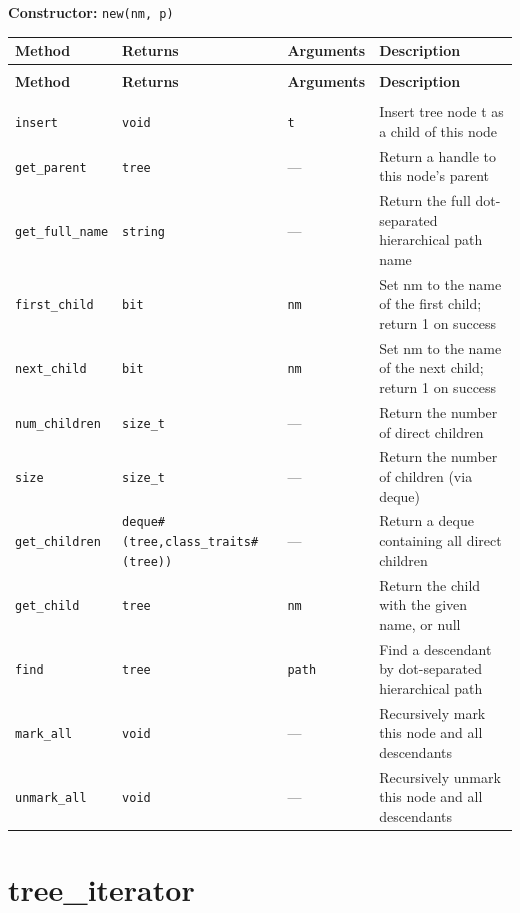 \documentclass[11pt,letterpaper]{report}
\begin{document}
\noindent\textbf{Constructor:} \texttt{new(nm, p)}

\begin{xltabular}{\linewidth}{>{\small}p{1.35in} >{\small}p{1.25in} >{\small}p{0.95in} >{\small}X}
\toprule
\textbf{Method} & \textbf{Returns} & \textbf{Arguments} & \textbf{Description} \\
\midrule
\endfirsthead
{} \\
\midrule
\textbf{Method} & \textbf{Returns} & \textbf{Arguments} & \textbf{Description} \\
\midrule
\endhead
\midrule
{} \\
\endfoot
\bottomrule
\endlastfoot
\texttt{insert} & \texttt{void} & \texttt{t} & Insert tree node t as a child of this node \\
\texttt{get\_parent} & \texttt{tree} & --- & Return a handle to this node's parent \\
\texttt{get\_full\_name} & \texttt{string} & --- & Return the full dot-separated hierarchical path name \\
\texttt{first\_child} & \texttt{bit} & \texttt{nm} & Set nm to the name of the first child; return 1 on success \\
\texttt{next\_child} & \texttt{bit} & \texttt{nm} & Set nm to the name of the next child; return 1 on success \\
\texttt{num\_children} & \texttt{size\_t} & --- & Return the number of direct children \\
\texttt{size} & \texttt{size\_t} & --- & Return the number of children (via deque) \\
\texttt{get\_children} & \texttt{deque\#(tree,class\_traits\#(tree))} & --- & Return a deque containing all direct children \\
\texttt{get\_child} & \texttt{tree} & \texttt{nm} & Return the child with the given name, or null \\
\texttt{find} & \texttt{tree} & \texttt{path} & Find a descendant by dot-separated hierarchical path \\
\texttt{mark\_all} & \texttt{void} & --- & Recursively mark this node and all descendants \\
\texttt{unmark\_all} & \texttt{void} & --- & Recursively unmark this node and all descendants \\
\end{xltabular}

\section{tree\_iterator}
\label{cls:treeiterator}
\end{document}
